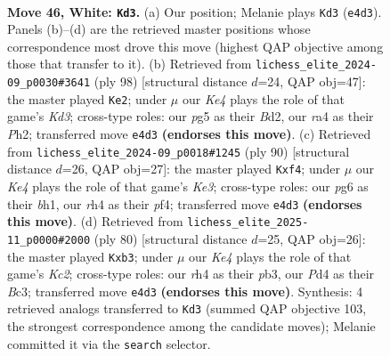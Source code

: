 \documentclass[11pt]{article}
\begin{document}
\clearpage

\begin{figure}[p]\centering
\begin{subfigure}{0.46\textwidth}\centering
\resizebox{\linewidth}{!}{%
\newchessgame
\chessboard[
  setfen={8/4k3/1pR3p1/6p1/rp1PK2r/8/8/2B5 w - - 1 46},
  showmover=false,
  pgfstyle=straightmove, color=movearrow, markmove={e4-d3}
]}
\caption{}
\end{subfigure}\hfill
\begin{subfigure}{0.46\textwidth}\centering
\resizebox{\linewidth}{!}{%
\newchessgame
\chessboard[
  setfen={8/1p3kp1/p6p/3r4/8/1R1K4/3B2PP/8 w - - 0 50},
  showmover=false,
  pgfstyle=straightmove, color=movearrow, markmove={d3-e2}
]}
\caption{}
\end{subfigure}
\\[4pt]
\begin{subfigure}{0.46\textwidth}\centering
\resizebox{\linewidth}{!}{%
\newchessgame
\chessboard[
  setfen={8/P3k3/7R/5p2/5p2/r1p1K3/2B5/7b w - - 0 46},
  showmover=false,
  pgfstyle=straightmove, color=movearrow, markmove={e3-f4}
]}
\caption{}
\end{subfigure}\hfill
\begin{subfigure}{0.46\textwidth}\centering
\resizebox{\linewidth}{!}{%
\newchessgame
\chessboard[
  setfen={R2b4/5ppk/8/3r3p/8/1pB3P1/2K5/8 w - - 0 41},
  showmover=false,
  pgfstyle=straightmove, color=movearrow, markmove={c2-b3}
]}
\caption{}
\end{subfigure}
\caption{\textbf{Move 46, White: \texttt{Kd3}.} (a) Our position; Melanie plays \texttt{Kd3} (\texttt{e4d3}). Panels (b)--(d) are the retrieved master positions whose correspondence most drove this move (highest QAP objective among those that transfer to it). (b) Retrieved from \texttt{lichess\_elite\_2024-09\_p0030\#3641} (ply 98) [structural distance $d$=24, QAP obj=47]: the master played \texttt{Ke2}; under $\mu$ our \emph{Ke4} plays the role of that game's \emph{Kd3}; cross-type roles: our \emph{p}g5 as their \emph{B}d2, our \emph{r}a4 as their \emph{P}h2; transferred move \texttt{e4d3} \textbf{(endorses this move)}. (c) Retrieved from \texttt{lichess\_elite\_2024-09\_p0018\#1245} (ply 90) [structural distance $d$=26, QAP obj=27]: the master played \texttt{Kxf4}; under $\mu$ our \emph{Ke4} plays the role of that game's \emph{Ke3}; cross-type roles: our \emph{p}g6 as their \emph{b}h1, our \emph{r}h4 as their \emph{p}f4; transferred move \texttt{e4d3} \textbf{(endorses this move)}. (d) Retrieved from \texttt{lichess\_elite\_2025-11\_p0000\#2000} (ply 80) [structural distance $d$=25, QAP obj=26]: the master played \texttt{Kxb3}; under $\mu$ our \emph{Ke4} plays the role of that game's \emph{Kc2}; cross-type roles: our \emph{r}h4 as their \emph{p}b3, our \emph{P}d4 as their \emph{B}c3; transferred move \texttt{e4d3} \textbf{(endorses this move)}. Synthesis: 4 retrieved analogs transferred to \texttt{Kd3} (summed QAP objective 103, the strongest correspondence among the candidate moves); Melanie committed it via the \texttt{search} selector.}
\label{fig:thought-m90}
\end{figure}
\end{document}
